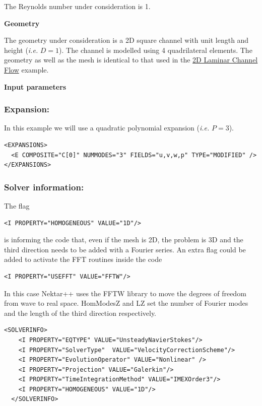 The Reynolds number under consideration is 1.

\textbf{Geometry}

The geometry under consideration is a 2D square channel with unit length and height (\textit{i.e.} $D=1$). The channel is modelled using 4 quadrilateral elements. The geometry as well as the mesh is identical to that used in the \hyperref[LaminarChannelFlow2D]{2D Laminar Channel Flow} example.

\textbf{Input parameters}

\subsubsection{Expansion:~} In this example we will use a quadratic polynomial expansion (\textit{i.e.} $P=3$).
\begin{lstlisting}[style=XMLStyle]
<EXPANSIONS>
  <E COMPOSITE="C[0]" NUMMODES="3" FIELDS="u,v,w,p" TYPE="MODIFIED" />
</EXPANSIONS>
\end{lstlisting}

\subsubsection{Solver information:~}  The flag 
\begin{lstlisting}[style=XMLStyle] 
<I PROPERTY="HOMOGENEOUS" VALUE="1D"/> 
\end{lstlisting} 
is informing the code that, even if the mesh is 2D, the problem is 3D and the third direction needs to be added with a Fourier series. An extra flag could be added to activate the FFT routines inside the code 
\begin{lstlisting}[style=XMLStyle]
<I PROPERTY="USEFFT" VALUE="FFTW"/>
\end{lstlisting} 

In this case Nektar++ uses the FFTW library to move the degrees of freedom from wave to real space. HomModesZ and LZ set the number of Fourier modes and the length of the third direction respectively.
\begin{lstlisting}[style=XMLStyle]
  <SOLVERINFO>
    <I PROPERTY="EQTYPE" VALUE="UnsteadyNavierStokes"/>
    <I PROPERTY="SolverType"  VALUE="VelocityCorrectionScheme"/>
    <I PROPERTY="EvolutionOperator" VALUE="Nonlinear" />
    <I PROPERTY="Projection" VALUE="Galerkin"/>
    <I PROPERTY="TimeIntegrationMethod" VALUE="IMEXOrder3"/>
    <I PROPERTY="HOMOGENEOUS" VALUE="1D"/>
  </SOLVERINFO>
\end{lstlisting}

